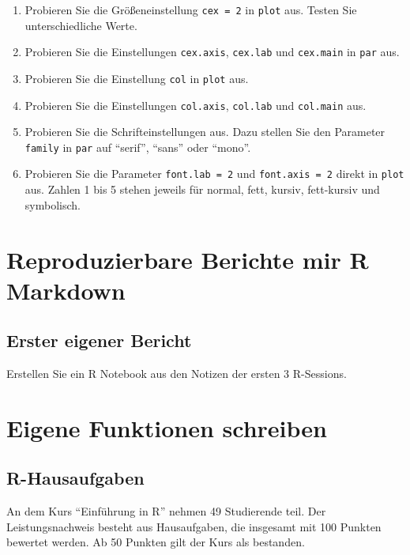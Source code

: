 \documentclass[]{book}
\providecommand{\tightlist}{%
  \setlength{\itemsep}{0pt}\setlength{\parskip}{0pt}}
\begin{document}
\begin{enumerate}
\def\labelenumi{\arabic{enumi}.}
\tightlist
\item
  Probieren Sie die Größeneinstellung \texttt{cex\ =\ 2} in \texttt{plot} aus. Testen Sie unterschiedliche Werte.
\item
  Probieren Sie die Einstellungen \texttt{cex.axis}, \texttt{cex.lab} und \texttt{cex.main} in \texttt{par} aus.
\item
  Probieren Sie die Einstellung \texttt{col} in \texttt{plot} aus.
\item
  Probieren Sie die Einstellungen \texttt{col.axis}, \texttt{col.lab} und \texttt{col.main} aus.
\item
  Probieren Sie die Schrifteinstellungen aus. Dazu stellen Sie den Parameter \texttt{family} in \texttt{par} auf ``serif'', ``sans'' oder ``mono''.
\item
  Probieren Sie die Parameter \texttt{font.lab\ =\ 2} und \texttt{font.axis\ =\ 2} direkt in \texttt{plot} aus. Zahlen 1 bis 5 stehen jeweils für normal, fett, kursiv, fett-kursiv und symbolisch.
\end{enumerate}

\hypertarget{reproduzierbare-berichte-mir-r-markdown}{%
\section{Reproduzierbare Berichte mir R Markdown}\label{reproduzierbare-berichte-mir-r-markdown}}

\hypertarget{erster-eigener-bericht}{%
\subsection{Erster eigener Bericht}\label{erster-eigener-bericht}}

Erstellen Sie ein R Notebook aus den Notizen der ersten 3 R-Sessions.

\hypertarget{eigene-funktionen-schreiben}{%
\section{Eigene Funktionen schreiben}\label{eigene-funktionen-schreiben}}

\hypertarget{r-hausaufgaben}{%
\subsection{R-Hausaufgaben}\label{r-hausaufgaben}}

An dem Kurs ``Einführung in R'' nehmen 49 Studierende teil. Der Leistungsnachweis besteht aus Hausaufgaben, die insgesamt mit 100 Punkten bewertet werden. Ab 50 Punkten gilt der Kurs als bestanden.
\end{document}
